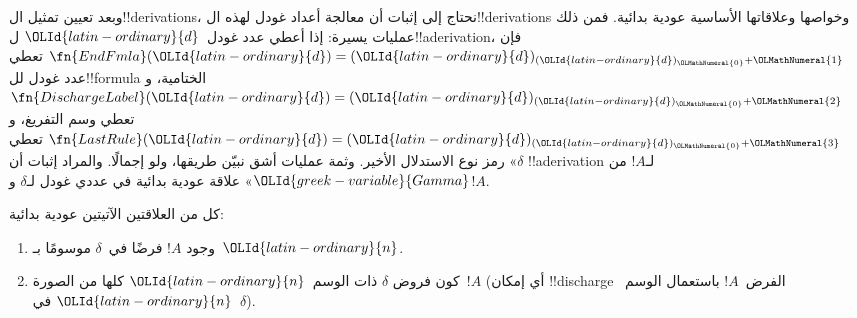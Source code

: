 \documentclass[../../../include/open-logic-section]{subfiles}
\begin{document}
\begin{explain}
وبعد تعيين تمثيل ال!!{derivation}s،
نحتاج إلى إثبات أن معالجة أعداد غودل
لهذه ال!!{derivation}s وخواصها وعلاقاتها
الأساسية عودية بدائية. فمن ذلك عمليات
يسيرة: إذا أعطي عدد غودل~$\OLId{latin-ordinary}{d}$
ل!!a{derivation}، فإن
$\fn{EndFmla}(\OLId{latin-ordinary}{d})=(\OLId{latin-ordinary}{d})_{(\OLId{latin-ordinary}{d})_\OLMathNumeral{0}+\OLMathNumeral{1}}$
تعطي عدد غودل لل!!{formula} الختامية،
و$\fn{DischargeLabel}(\OLId{latin-ordinary}{d})=(\OLId{latin-ordinary}{d})_{(\OLId{latin-ordinary}{d})_\OLMathNumeral{0}+\OLMathNumeral{2}}$
تعطي وسم التفريغ،
و$\fn{LastRule}(\OLId{latin-ordinary}{d})=(\OLId{latin-ordinary}{d})_{(\OLId{latin-ordinary}{d})_\OLMathNumeral{0}+\OLMathNumeral{3}}$
تعطي رمز نوع الاستدلال الأخير.
وثمة عمليات أشق نبيّن طريقها، ولو
إجمالًا. والمراد إثبات أن «$\delta$
!!a{derivation} لـ$!A$ من $\OLId{greek-variable}{Gamma}$»
علاقة عودية بدائية في عددي غودل
لـ$\delta$ و$!A$.
\end{explain}

\begin{prop}
  كل من العلاقتين الآتيتين عودية بدائية:
  \begin{enumerate}
  \item وجود $!A$ فرضًا في~$\delta$ موسومًا بـ~$\OLId{latin-ordinary}{n}$.
  \item كون فروض $\delta$ ذات الوسم~$\OLId{latin-ordinary}{n}$ كلها من الصورة~$!A$
    (أي إمكان !!{discharge} الفرض~$!A$ باستعمال الوسم~$\OLId{latin-ordinary}{n}$ في~$\delta$).
  \end{enumerate}
\end{prop}
\end{document}

